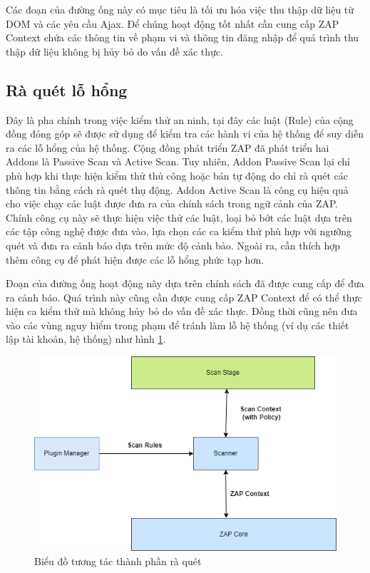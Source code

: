 \documentclass[./../main.tex]{subfiles}
\begin{document}
Các đoạn của đường ống này có mục tiêu là tối ưu hóa việc thu thập dữ liệu từ
DOM và các yêu cầu Ajax. Để chúng hoạt động tốt nhất cần cung cấp
ZAP Context chứa các thông tin về phạm vi và thông tin đăng nhập để quá
trình thu thập dữ liệu không bị hủy bỏ do vấn đề xác thực.

\subsection{Rà quét lỗ hổng}

Đây là pha chính trong việc kiểm thử an ninh, tại đây các luật (Rule)
của cộng đồng đóng góp sẽ được sử dụng để kiểm tra các hành vi của hệ
thống để suy diễn ra các lỗ hổng của hệ thống. Cộng đồng phát triển ZAP
đã phát triển hai Addons là Passive Scan và Active Scan. Tuy nhiên,
Addon Passive Scan lại chỉ phù hợp khi thực hiện kiểm thử thủ công hoặc bán
tự động do chỉ rà quét các thông tin bằng cách rà quét thụ động. Addon Active Scan
là công cụ hiệu quả cho việc chạy các luật được đưa ra của chính sách trong
ngữ cảnh của ZAP. Chính công cụ này sẽ thực hiện việc thử các luật, loại bỏ
bớt các luật dựa trên các tập công nghệ được đưa vào, lựa chọn các ca kiểm
thử phù hợp với ngưỡng quét và đưa ra cảnh báo dựa trên mức độ cảnh bảo. Ngoài ra,
cần thích hợp thêm công cụ để phát hiện được các lỗ hổng phức tạp hơn.

Đoạn của đường ống hoạt động này dựa trên chính sách đã được cung cấp để đưa ra
cảnh báo. Quá trình này cũng cần được cung cấp ZAP Context để có thể thực
hiện ca kiểm thử mà không hủy bỏ do vấn đề xác thực. Đồng thời cũng nên đưa
vào các vùng nguy hiểm trong phạm để tránh làm lỗ hệ thống (ví dụ các
thiết lập tài khoản, hệ thống) như hình \ref{fig:scan_stage}.

\begin{figure}[ht!]
	\includegraphics[width=\linewidth]{./images/scan_stage.png}
	\caption{Biểu đồ tương tác thành phần rà quét}
	\label{fig:scan_stage}
\end{figure}
\end{document}
